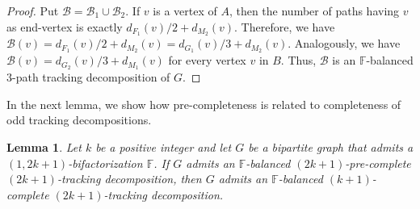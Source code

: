 \documentclass[12pt,reqno,a4paper]{amsart}
\newtheorem{lemma}[theorem]{Lemma}
\newcommand{\B}{\mathcal{B}}
\begin{document}
\begin{proof}
	
	Put \(\B = \B_1\cup\B_2\). 
	If \(v\) is a vertex of \(A\), then the number of paths having \(v\) as end-vertex
	is exactly \(d_{F_1}(v)/2 + d_{M_2}(v)\).
	Therefore,
	we have \(\B(v) =  d_{F_1}(v)/2 +  d_{M_2}(v)  = d_{G_1}(v)/3 + d_{M_2}(v)\).
	Analogously, we have \(\B(v) = d_{G_2}(v)/3 + d_{M_1}(v)\)
	for every vertex \(v\) in \(B\).
	Thus, \(\B\) is an \(\mathbb{F}\)-balanced $3$-path tracking decomposition of \(G\).
	
\end{proof}



In the next lemma, we show how pre-completeness is related to completeness
of odd tracking decompositions.  


\begin{lemma}\label{lemma:odd-complete}
	Let \(k\) be a positive integer and let 
	\(G\) be a bipartite graph that admits a  
	\((1,2k+1)\)-bifactorization \(\mathbb{F}\).
	If \(G\) admits an \(\mathbb{F}\)-balanced 
\((2k+1)\)-pre-complete
	$(2k+1)$-tracking decomposition, 
	then \(G\) admits an \(\mathbb{F}\)-balanced \((k+1)\)-complete 
	$(2k+1)$-tracking decomposition.
\end{lemma}
\end{document}
